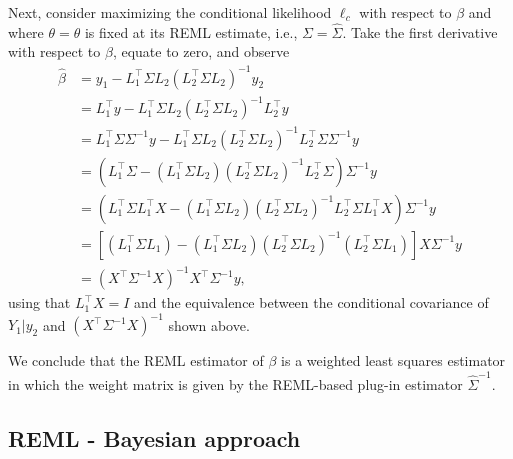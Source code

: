 \documentclass[
]{book}
\begin{document}
Next, consider maximizing the conditional likelihood \(\ell_c\) with respect to \(\beta\) and where \(\theta=\hat\theta\) is fixed at its REML estimate, i.e., \(\Sigma = \hat\Sigma\). Take the first derivative with respect to \(\beta\), equate to zero, and observe
\begin{align*}
\hat\beta &= y_1 - L_1^\top \Sigma L_2(L_2^\top \Sigma L_2)^{-1}y_2\\
&= L_1^\top y - L_1^\top \Sigma L_2(L_2^\top \Sigma L_2)^{-1}L_2^\top y\\
&= L_1^\top \Sigma \Sigma^{-1}y - L_1^\top \Sigma L_2(L_2^\top \Sigma L_2)^{-1}L_2^\top \Sigma\Sigma^{-1}y\\
& = (L_1^\top \Sigma - (L_1^\top \Sigma L_2)(L_2^\top \Sigma L_2)^{-1}L_2^\top \Sigma)\Sigma^{-1}y\\
& = (L_1^\top \Sigma L_1^\top X - (L_1^\top \Sigma L_2)(L_2^\top \Sigma L_2)^{-1}L_2^\top \Sigma L_1^\top X)\Sigma^{-1}y\\
& = [(L_1^\top \Sigma L_1)-(L_1^\top \Sigma L_2)(L_2^\top \Sigma L_2)^{-1}(L_2^\top \Sigma L_1)]X\Sigma^{-1}y\\
& = (X^\top \Sigma^{-1}X)^{-1}X^\top \Sigma^{-1}y,
\end{align*}
using that \(L_1^\top X = I\) and the equivalence between the conditional covariance of \(Y_1|y_2\) and \((X^\top \Sigma^{-1}X)^{-1}\) shown above.

We conclude that the REML estimator of \(\beta\) is a weighted least squares estimator in which the weight matrix is given by the REML-based plug-in estimator \(\hat\Sigma^{-1}\).

\hypertarget{reml---bayesian-approach}{%
\subsection{REML - Bayesian approach}\label{reml---bayesian-approach}}
\end{document}
